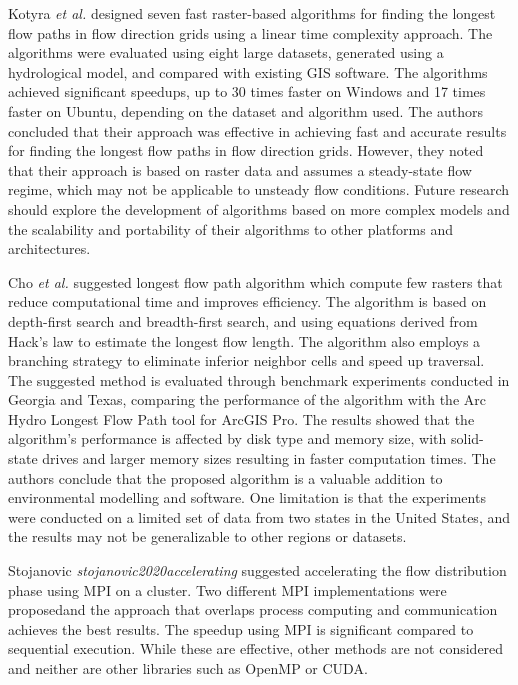 \documentclass[journal, a4paper]{IEEEtran}
\begin{document}
	Kotyra \textit{et al.} \cite{KOTYRA2023105728} designed seven fast raster-based algorithms for finding the longest flow paths in flow direction grids using a linear time complexity approach. The algorithms were evaluated using eight large datasets, generated using a hydrological model, and compared with existing GIS software. The algorithms achieved significant speedups, up to 30 times faster on Windows and 17 times faster on Ubuntu, depending on the dataset and algorithm used. The authors concluded that their approach was effective in achieving fast and accurate results for finding the longest flow paths in flow direction grids. However, they noted that their approach is based on raster data and assumes a steady-state flow regime, which may not be applicable to unsteady flow conditions. Future research should explore the development of algorithms based on more complex models and the scalability and portability of their algorithms to other platforms and architectures.
	
	Cho \textit{et al.} \cite{CHO2020104774} suggested longest flow path algorithm which compute few rasters that reduce computational time and improves efficiency. The algorithm is based on depth-first search and breadth-first search, and using equations derived from Hack's law to estimate the longest flow length. The algorithm also employs a branching strategy to eliminate inferior neighbor cells and speed up traversal. The suggested method is evaluated through benchmark experiments conducted in Georgia and Texas, comparing the performance of the algorithm with the Arc Hydro Longest Flow Path tool for ArcGIS Pro. The results showed that the algorithm's performance is affected by disk type and memory size, with solid-state drives and larger memory sizes resulting in faster computation times. The authors conclude that the proposed algorithm is a valuable addition to environmental modelling and software. One limitation is that the experiments were conducted on a limited set of data from two states in the United States, and the results may not be generalizable to other regions or datasets. 

	Stojanovic \textit{stojanovic2020accelerating} suggested accelerating the flow distribution phase using MPI on a cluster. Two different MPI implementations were proposedand the approach that overlaps process computing and communication achieves the best results. The speedup using MPI is significant compared to sequential execution. While these are effective, other methods are not considered and neither are other libraries such as OpenMP or CUDA.
	
\end{document}
